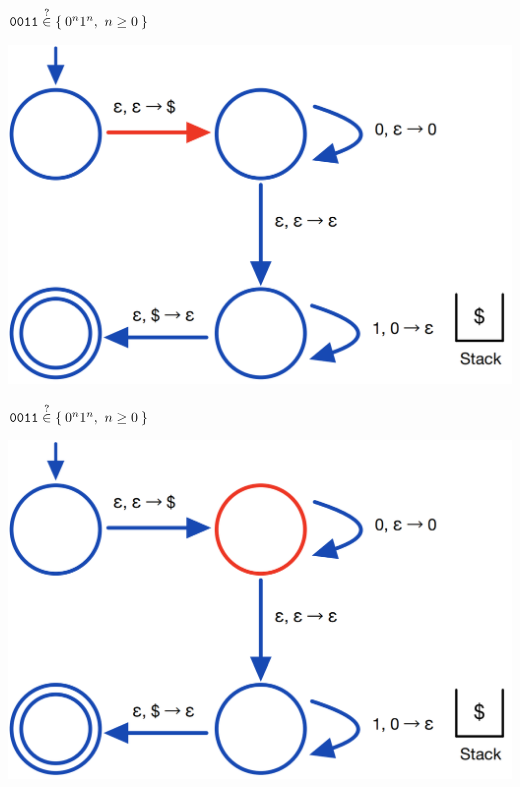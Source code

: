 \documentclass[aspectratio=169]{beamer}
\begin{document}
\begin{frame}{$\texttt{0011} \stackrel{?}{\in} \Set{0^n 1^n,\ n \geq 0}$}
    \begin{center}
        \includegraphics[scale=0.30]{images/pda_comp/PDA_Comp_2.png}
    \end{center}
\end{frame}

\begin{frame}{$\texttt{0011} \stackrel{?}{\in} \Set{0^n 1^n,\ n \geq 0}$}
    \begin{center}
        \includegraphics[scale=0.30]{images/pda_comp/PDA_Comp_3.png}
    \end{center}
\end{frame}
\end{document}
